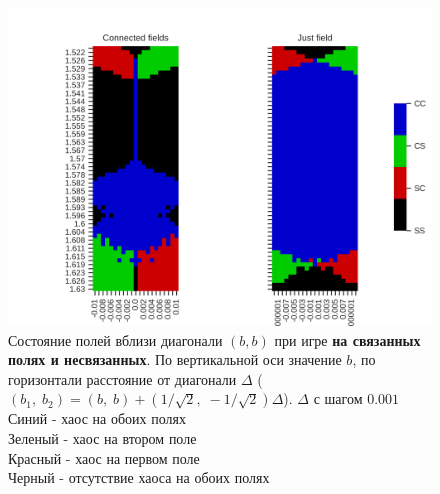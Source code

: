 \documentclass[12pt]{article}
\begin{document}
    \begin{figure}[H]
         \centering
         \includegraphics[width=0.95\columnwidth, keepaspectratio=True]{DoubleField/double_field_state_comparasion.png}
         \caption{Состояние полей вблизи диагонали $(b, b)$ при игре \textbf{на связанных полях и несвязанных}. По вертикальной оси значение $b$, по горизонтали расстояние от диагонали $\Delta$ ($(b_1,\;b_2) = (b,\;b) + (1/\sqrt{2},\;-1/\sqrt{2})\Delta$). $\Delta$ с шагом $0.001$\\
         Синий - хаос на обоих полях\\
         Зеленый - хаос на втором поле\\
         Красный - хаос на первом поле\\
         Черный - отсутствие хаоса на обоих полях}
         \label{fig:chaos_states}
    \end{figure}
    
\end{document}
